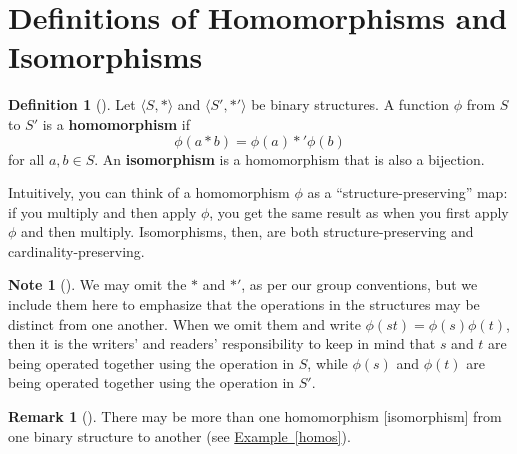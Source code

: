 \documentclass[10pt,]{book}
\newcommand{\terminology}[1]{\textbf{#1}}
\theoremstyle{plain}
\theoremstyle{definition}
\newtheorem{definition}[theorem]{Definition}
\theoremstyle{definition}
\newtheorem{remark}[theorem]{Remark}
\newtheorem{note}[theorem]{Note}
\theoremstyle{definition}
\theoremstyle{definition}
\numberwithin{equation}{section}
\begin{document}
\section[{Definitions of Homomorphisms and Isomorphisms}]{Definitions of Homomorphisms and Isomorphisms}\label{homosandisos}
\begin{definition}[{}]\label{definition-32}
Let \(\langle S,*\rangle\) and \(\langle S',*'\rangle\) be binary structures. A function \(\phi\) from \(S\) to \(S'\) is a \terminology{homomorphism} if%
\begin{equation*}
\phi(a* b)=\phi(a)*'\phi(b)
\end{equation*}
for all \(a,b\in S\). An \terminology{isomorphism} is a homomorphism that is also a bijection.%
\end{definition}
Intuitively, you can think of a homomorphism \(\phi\) as a ``structure-preserving'' map: if you multiply and then apply \(\phi\), you get the same result as when you first apply \(\phi\) and then multiply. Isomorphisms, then, are both structure-preserving and cardinality-preserving.%
\begin{note}[]\label{note-6}
We may omit the \(*\) and \(*'\), as per our group conventions, but we include them here to emphasize that the operations in the structures may be distinct from one another. When we omit them and write \(\phi(st)=\phi(s)\phi(t)\), then it is the writers' and readers' responsibility to keep in mind that \(s\) and \(t\) are being operated together using the operation in \(S\), while \(\phi(s)\) and \(\phi(t)\) are being operated together using the operation in \(S'\).%
\end{note}
\begin{remark}[]\label{remark-17}
There may be more than one homomorphism [isomorphism] from one binary structure to another (see \hyperref[homos]{Example~\ref{homos}}).%
\end{remark}
\end{document}
